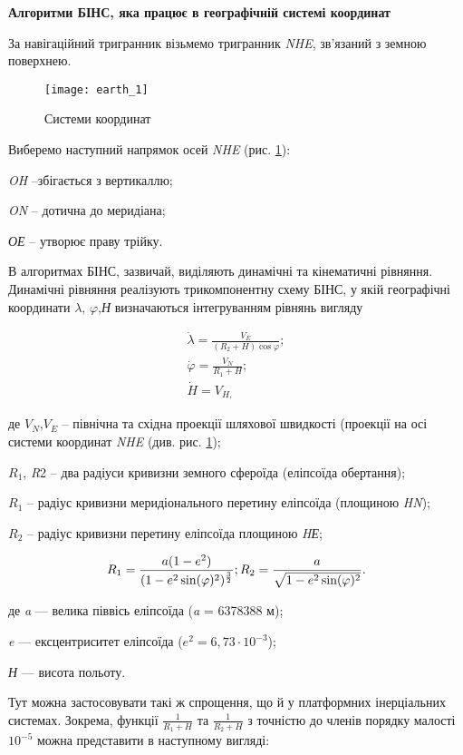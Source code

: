 \textbf{Алгоритми БІНС, яка працює в географічній системі координат}

За навігаційний тригранник візьмемо тригранник \textit{NHE}, зв'язаний з земною поверхнею.
\begin{figure}[here]
\centering
\texttt{[image: earth\_1]}
\caption{Системи координат}
\label{fig:earth}
\end{figure} 
Виберемо наступний напрямок осей   \textit{NHE} (рис. \ref{fig:earth}):
\begin{ESKDexplanation}
\item \textit{OH} --збігається з вертикаллю;
\item \textit{ON} -- дотична до меридіана;
\item \textit{ОЕ} -- утворює праву трійку.
\end{ESKDexplanation}
В алгоритмах БІНС, зазвичай, виділяють динамічні та кінематичні рівняння. 
Динамічні рівняння реалізують трикомпонентну схему БІНС, у якій географічні координати  $\lambda$, 
$\varphi$,\textit{Н} визначаються інтегруванням рівнянь вигляду

\[\begin{array}{l} 
{\dot{\lambda}=\frac{V_{E}}{(R_{2} +H)\cos \varphi} ;} \\ 
{\dot{\varphi}=\frac{V_{N}}{R_{1} +H} ;} \\ 
{\dot{H}=V_{H,}} 
\end{array}\] 
\begin{ESKDexplanation}
\item де  $V_{N}$,$V_{E}$ -- північна та східна проекції шляхової швидкості 
(проекції на осі  системи координат \textit{NHE}  (див. рис. \ref{fig:earth}); 
\item $R_1$, \textit{R}2 -- два радіуси кривизни земного сфероїда (еліпсоїда обертання); 
\item $R_1$ -- радіус кривизни меридіонального перетину еліпсоїда (площиною \textit{HN}); 
\item $R_2$  -- радіус кривизни перетину еліпсоїда площиною \textit{HЕ}; 
\end{ESKDexplanation}
\[R_{1} =\frac{a(1-e^{2})}{(1-e^{2} \sin(\varphi)^{2})^{\frac{3}{2}}};\\
R_{2} =\frac{a}{\sqrt{1-e^{2} \sin(\varphi)^{2}}}.\] 
\begin{ESKDexplanation}
\item де\textit{ a}  --- велика піввісь  еліпсоїда (\textit{a }=  6378388 м); 
\item \textit{e} --- ексцентриситет еліпсоїда  ($e^{2} = 6,73 \cdot 10^{-3}$);  
\item \textit{Н}  --- висота польоту. 
\end{ESKDexplanation}
Тут можна застосовувати такі ж спрощення, що й у платформних інерціальних системах. 
Зокрема, функції   $\frac{1}{R_{1} +H}$ та $\frac{1}{R_{2} +H} $ 
з точністю до членів порядку малості $10^{-5}$ можна представити 
в наступному вигляді:

